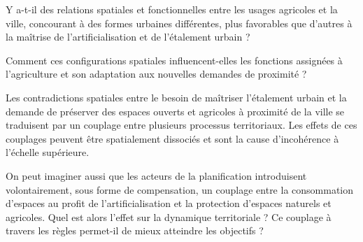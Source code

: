 	



Y a-t-il des relations spatiales et fonctionnelles entre les usages agricoles
et la ville, concourant à des formes urbaines différentes,
plus favorables que d'autres à la maîtrise de l'artificialisation
et de l'étalement urbain ?

Comment ces configurations spatiales influencent-elles les fonctions
assignées à l'agriculture et son adaptation aux nouvelles demandes de proximité ?



Les contradictions spatiales entre le besoin de maîtriser l'étalement urbain
et la demande de préserver des espaces ouverts et agricoles à proximité de la ville
se traduisent par un couplage entre plusieurs processus territoriaux.
Les effets de ces couplages peuvent être spatialement dissociés
et sont la cause d'incohérence à l'échelle supérieure.

On peut imaginer aussi que les acteurs de la planification
introduisent volontairement, sous forme de compensation, un couplage
entre la consommation d'espaces au profit de l'artificialisation
et la protection d'espaces naturels et agricoles. Quel est alors
l'effet sur la dynamique territoriale ? Ce couplage
à travers les règles permet-il de mieux atteindre les objectifs ?


